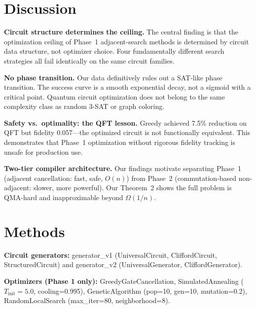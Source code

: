 \documentclass[aps,preprint,secnum,lined]{revtex4-2}
\begin{document}

\section{Discussion}

\textbf{Circuit structure determines the ceiling.} The central finding is that the optimization ceiling of Phase~1 adjacent-search methods is determined by circuit data structure, not optimizer choice. Four fundamentally different search strategies all fail identically on the same circuit families.

\textbf{No phase transition.} Our data definitively rules out a SAT-like phase transition. The success curve is a smooth exponential decay, not a sigmoid with a critical point. Quantum circuit optimization does not belong to the same complexity class as random 3-SAT or graph coloring.

\textbf{Safety vs.\ optimality: the QFT lesson.} Greedy achieved 7.5\% reduction on QFT but fidelity 0.057---the optimized circuit is not functionally equivalent. This demonstrates that Phase~1 optimization without rigorous fidelity tracking is unsafe for production use.

\textbf{Two-tier compiler architecture.} Our findings motivate separating Phase~1 (adjacent cancellation: fast, safe, $O(n)$) from Phase~2 (commutation-based non-adjacent: slower, more powerful). Our Theorem~2 shows the full problem is QMA-hard and inapproximable beyond $\Omega(1/n)$.


\section{Methods}

\textbf{Circuit generators:} generator\_v1 (UniversalCircuit, CliffordCircuit, StructuredCircuit) and generator\_v2 (UniversalGenerator, CliffordGenerator).

\textbf{Optimizers (Phase 1 only):} GreedyGateCancellation, SimulatedAnnealing ($T_{\text{init}}=5.0$, cooling=0.995), GeneticAlgorithm (pop=10, gen=10, mutation=0.2), RandomLocalSearch (max\_iter=80, neighborhood=8).
\end{document}

